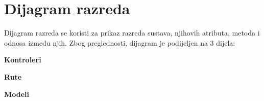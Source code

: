 			
		\section{Dijagram razreda}        

			
            Dijagram razreda se koristi za prikaz razreda sustava, njihovih atributa, metoda i odnosa između njih.
            Zbog preglednosti, dijagram je podijeljen na 3 dijela:
            \begin{packed_item}
                \item \textbf{Kontroleri}
                \item \textbf{Rute}
                \item \textbf{Modeli}
            \end{packed_item}
           

